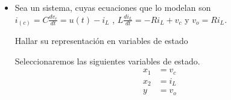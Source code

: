 \documentclass[12pt]{article}
\begin{document}
\begin{itemize}
    \item Sea un sistema, cuyas ecuaciones que lo modelan son $i_(c)=C\frac{dv_{c}}{dt}=u(t)-i_{L}$ , $L\frac{di_{L}}{dt}=-Ri_{L}+v_{c}$ y $v_{o}=Ri_{L}$. 
    
    Hallar su representación en variables de estado

    Seleccionaremos las siguientes variables de estado.
    \begin{equation}
        \begin{split}
        x_{1}&=v_{c}\\
        x_{2}&=i_{L}\\
        y&=v_{o}\\
        \label{eq:state_ejem3}
        \end{split}
    \end{equation}


\end{itemize}
\end{document}
